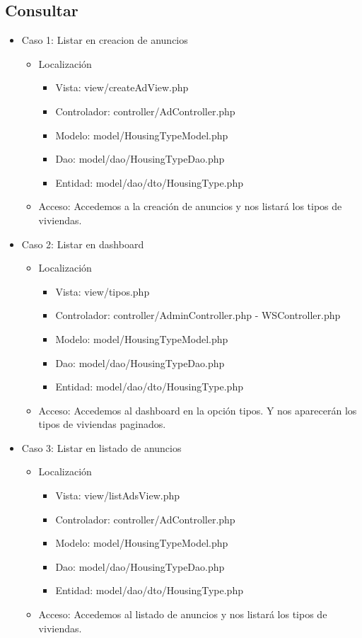 \subsection{Consultar}
\begin{itemize}
\item Caso 1: Listar en creacion de anuncios
\begin{itemize}
\item Localizaci\'{o}n
\begin{itemize}
\item Vista: view/createAdView.php
\item Controlador: controller/AdController.php
\item Modelo: model/HousingTypeModel.php
\item Dao: model/dao/HousingTypeDao.php
\item Entidad: model/dao/dto/HousingType.php
\end{itemize}
\item Acceso: Accedemos a la creaci\'{o}n de anuncios y nos listar\'{a} los tipos de viviendas.
\end{itemize}
\item Caso 2: Listar en dashboard
\begin{itemize}
\item Localizaci\'{o}n
\begin{itemize}
\item Vista: view/tipos.php
\item Controlador: controller/AdminController.php - WSController.php
\item Modelo: model/HousingTypeModel.php
\item Dao: model/dao/HousingTypeDao.php
\item Entidad: model/dao/dto/HousingType.php
\end{itemize}
\item Acceso: Accedemos al dashboard en la opci\'{o}n tipos. Y nos aparecer\'{a}n los tipos de viviendas paginados.
\end{itemize}
\item Caso 3: Listar en listado de anuncios
\begin{itemize}
\item Localizaci\'{o}n
\begin{itemize}
\item Vista: view/listAdsView.php
\item Controlador: controller/AdController.php
\item Modelo: model/HousingTypeModel.php
\item Dao: model/dao/HousingTypeDao.php
\item Entidad: model/dao/dto/HousingType.php
\end{itemize}
\item Acceso: Accedemos al listado de anuncios y nos listar\'{a} los tipos de viviendas.
\end{itemize}
\end{itemize}


